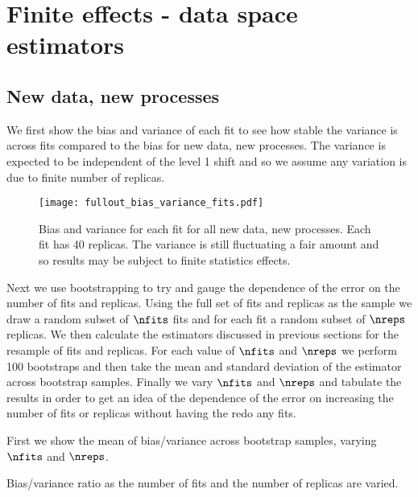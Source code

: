 \section{Finite effects - data space estimators}
\label{sec:fin-effs}

\subsection{New data, new processes}
\label{sec:new-dat}

We first show the bias and variance of each fit to see how stable the variance
is across fits compared to the bias for new data, new processes. The variance is
expected to be independent of the level 1 shift and so we assume any variation
is due to finite number of replicas.

\begin{figure}[!b]
    \centering
    \texttt{[image: fullout\_bias\_variance\_fits.pdf]}
    \caption{Bias and variance for each fit for all new data, new processes. Each
    fit has 40 replicas. The variance is still fluctuating a fair amount and
    so results may be subject to finite statistics effects.}
    \label{fig:outnewfitbiasvar}
\end{figure}

\FloatBarrier

Next we use bootstrapping to try and gauge the dependence of the error on the
number of fits and replicas. Using the full set of fits and replicas as the
sample we draw a random subset of $\nfits$ fits and for each fit a random subset
of $\nreps$ replicas. We then calculate the estimators discussed in previous
sections for the resample of fits and replicas. For each value of $\nfits$ and
$\nreps$ we perform 100 bootstraps and then take the mean and standard deviation
of the estimator across bootstrap samples. Finally we vary $\nfits$ and $\nreps$
and tabulate the results in order to get an idea of the dependence of the error
on increasing the number of fits or replicas without having the redo any fits.

First we show the mean of bias/variance across bootstrap samples, varying
$\nfits$ and $\nreps$.
%
\begin{table}[h!]
    \label{tab:fullout_finite_effects_ratio_mean}
    
    \caption{Bias/variance ratio as the number of fits and the number of replicas are varied.}
\end{table}

